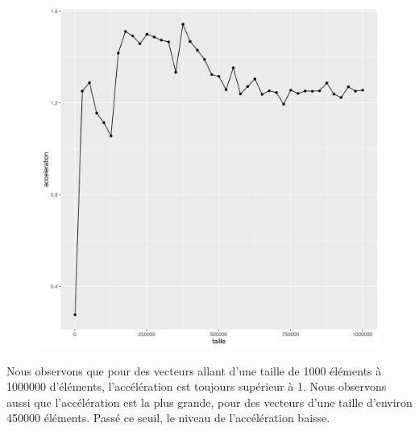 \documentclass[a4paper,11pt]{scrartcl}
\begin{document}
\begin{figure}[H] \center
   \includegraphics[scale=0.5] {graphes/global_temps_machine_accel11.png}
\end{figure}

Nous observons que pour des vecteurs allant d'une taille de 1000 \'el\'ements \`a 1000000 d'\'el\'ements, l'acc\'el\'eration est toujours sup\'erieur \`a 1. Nous observons aussi que l'acc\'el\'eration est la plus grande, pour des vecteurs d'une taille d'environ 450000 \'el\'ements. Pass\'e ce seuil, le niveau de l'acc\'el\'eration baisse.
\end{document}
